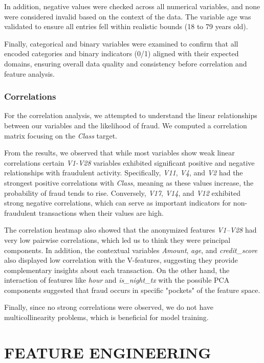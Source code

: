 \documentclass[12pt,a4paper]{report}
\begin{document}
In addition, negative values were checked across all numerical variables, and none were considered invalid based on the context of the data. The variable age was validated to ensure all entries fell within realistic bounds (18 to 79 years old).

Finally, categorical and binary variables were examined to confirm that all encoded categories and binary indicators (0/1) aligned with their expected domains, ensuring overall data quality and consistency before correlation and feature analysis.

\subsection{Correlations}
For the correlation analysis, we attempted to understand the linear relationships between our variables and the likelihood of fraud. We computed a correlation matrix focusing on the \textit{Class} target. 

From the results, we observed that while most variables show weak linear correlations certain \textit{V1-V28} variables exhibited significant positive and negative relationships with fraudulent activity. Specifically, \textit{V11}, \textit{V4}, and \textit{V2} had the strongest positive correlations with \textit{Class}, meaning as these values increase, the probability of fraud tends to rise. Conversely, \textit{V17}, \textit{V14}, and \textit{V12} exhibited strong negative correlations, which can serve as important indicators for non-fraudulent transactions when their values are high.

The correlation heatmap also showed that the anonymized features \textit{V1–V28} had very low pairwise correlations, which led us to think they were principal components. In addition, the contextual variables \textit{Amount}, \textit{age}, and \textit{credit\_score} also displayed low correlation with the V-features, suggesting they provide complementary insights about each transaction. On the other hand, the interaction of features like \textit{hour} and \textit{is\_night\_tx} with the possible PCA components suggested that fraud occurs in specific "pockets" of the feature space.

Finally, since no strong correlations were observed, we do not have multicollinearity problems, which is beneficial for model training.

\chapter{FEATURE ENGINEERING}
\end{document}

